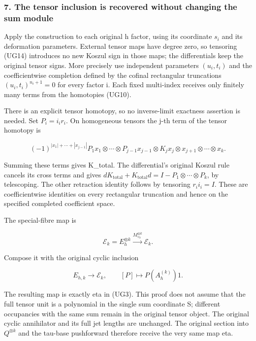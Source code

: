 \subsubsection{7. The tensor inclusion is recovered without changing the sum module}\label{endpoint-f1_unit_gauge--the-tensor-inclusion-is-recovered-without-changing-the-sum-module}

Apply the construction to each original h factor, using its coordinate \(s_i\) and its deformation parameters. External tensor maps have degree zero, so tensoring (UG14) introduces no new Koszul sign in those maps; the differentials keep the original tensor signs. More precisely use independent parameters \((u_i,t_i)\) and the coefficientwise completion defined by the cofinal rectangular truncations \((u_i,t_i)^{n_i+1}=0\) for every factor i. Each fixed multi-index receives only finitely many terms from the homotopies (UG10).

There is an explicit tensor homotopy, so no inverse-limit exactness assertion is needed. Set \(P_i=i_i r_i\). On homogeneous tensors the j-th term of the tensor homotopy is

\[
(-1)^{|x_1|+\cdots+|x_{j-1}|}
P_1x_1\otimes\cdots\otimes P_{j-1}x_{j-1}
\otimes K_jx_j\otimes x_{j+1}\otimes\cdots\otimes x_k.
\]

Summing these terms gives K\_total. The differential's original Koszul rule cancels its cross terms and gives \(d K_{\mathrm{total}}+K_{\mathrm{total}}d=I-P_1\otimes\cdots\otimes P_k\), by telescoping. The other retraction identity follows by tensoring \(r_i i_i=I\). These are coefficientwise identities on every rectangular truncation and hence on the specified completed coefficient space.

The special-fibre map is

\[
\mathcal E_k=E_h^{\otimes k}
\xrightarrow{M_{\upsilon_h}^{\otimes k}}\mathcal E_k.
\tag{UG18}
\]

Compose it with the original cyclic inclusion

\[
E_{h,k}\longrightarrow\mathcal E_k,
\qquad[P]\longmapsto P(A_h^{(k)})1.
\]

The resulting map is exactly eta in (UG3). This proof does not assume that the full tensor unit is a polynomial in the single sum coordinate S; different occupancies with the same sum remain in the original tensor object. The original cyclic annihilator and its full jet lengths are unchanged. The original section into \(Q^{\otimes k}\) and the tau-base pushforward therefore receive the very same map eta.

